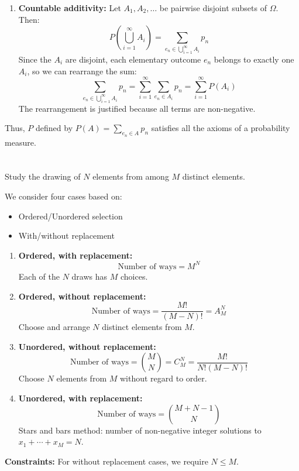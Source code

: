 \documentclass[12pt]{article}
\begin{document}
\begin{correctionbox}
\begin{enumerate}
    \item \textbf{Countable additivity:} Let $A_1, A_2, \ldots$ be pairwise disjoint subsets of $\Omega$. Then:
    \[
    P\left(\bigcup_{i=1}^\infty A_i\right) = \sum_{e_n \in \bigcup_{i=1}^\infty A_i} p_n
    \]
    Since the $A_i$ are disjoint, each elementary outcome $e_n$ belongs to exactly one $A_i$, so we can rearrange the sum:
    \[
    \sum_{e_n \in \bigcup_{i=1}^\infty A_i} p_n = \sum_{i=1}^\infty \sum_{e_n \in A_i} p_n = \sum_{i=1}^\infty P(A_i)
    \]
    The rearrangement is justified because all terms are non-negative.
\end{enumerate}

Thus, $P$ defined by $P(A) = \sum_{e_n \in A} p_n$ satisfies all the axioms of a probability measure.
\end{correctionbox}

\section{}
Study the drawing of $N$ elements from among $M$ distinct elements.

\begin{correctionbox}
We consider four cases based on:
\begin{itemize}
    \item Ordered/Unordered selection
    \item With/without replacement
\end{itemize}

\begin{enumerate}
    \item \textbf{Ordered, with replacement:}
    \[
    \text{Number of ways} = M^N
    \]
    Each of the $N$ draws has $M$ choices.
    
    \item \textbf{Ordered, without replacement:}
    \[
    \text{Number of ways} = \frac{M!}{(M-N)!} = A_M^N
    \]
    Choose and arrange $N$ distinct elements from $M$.
    
    \item \textbf{Unordered, without replacement:}
    \[
    \text{Number of ways} = \binom{M}{N} = C_M^N = \frac{M!}{N!(M-N)!}
    \]
    Choose $N$ elements from $M$ without regard to order.
    
    \item \textbf{Unordered, with replacement:}
    \[
    \text{Number of ways} = \binom{M+N-1}{N}
    \]
    Stars and bars method: number of non-negative integer solutions to $x_1 + \cdots + x_M = N$.
\end{enumerate}
\textbf{Constraints:} For without replacement cases, we require $N \leq M$.
\end{correctionbox}
\end{document}
